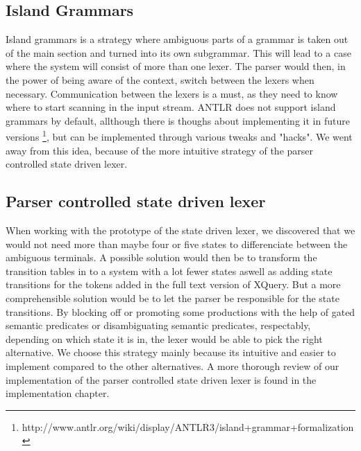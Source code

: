 \subsection{Island Grammars}
\label{sect:amiguousgrammar:islandGrammar}
Island grammars is a strategy where ambiguous parts of a grammar is taken out of the main section and turned into its own subgrammar. This will lead to a case where the system will consist of more than one lexer. The parser would then, in the power of being aware of the context, switch between the lexers when necessary. Communication between the lexers is a must, as they need to know where to start scanning in the input stream. ANTLR does not support island grammars by default, allthough there is thoughs about implementing it in future versions \footnote{http://www.antlr.org/wiki/display/ANTLR3/island+grammar+formalization}, but can be implemented through various tweaks and "hacks". We went away from this idea, because of the more intuitive strategy of the parser controlled state driven lexer.

\subsection{Parser controlled state driven lexer}
\label{sect:amiguousgrammar:parserControlled}
When working with the prototype of the state driven lexer, we discovered that we would not need more than maybe four or five states to differenciate between the ambiguous terminals. A possible solution would then be to transform the transition tables in \cite{createTokenizer} to a system with a lot fewer states aswell as adding state transitions for the tokens added in the full text version of XQuery. But a more comprehensible solution would be to let the parser be responsible for the state transitions. By blocking off or promoting some productions with the help of gated semantic predicates or disambiguating semantic predicates, respectably, depending on which state it is in, the lexer would be able to pick the right alternative. We choose this strategy mainly because its intuitive and easier to implement compared to the other alternatives. A more thorough review of our implementation of the parser controlled state driven lexer is found in the implementation chapter.
